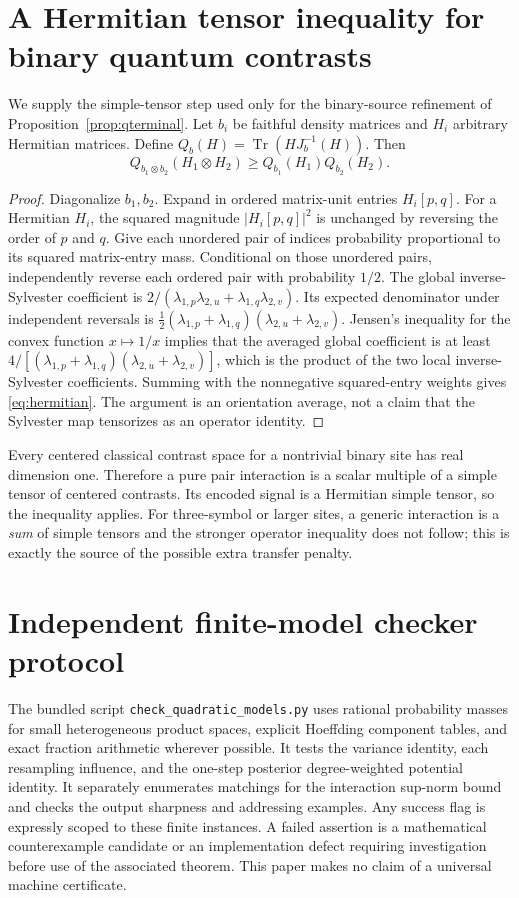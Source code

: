 \documentclass[11pt,letterpaper]{article}
\theoremstyle{definition}
\newcommand{\tr}{\operatorname{Tr}}
\begin{document}
\appendix
\section{A Hermitian tensor inequality for binary quantum contrasts}\label{sec:hermitian}
We supply the simple-tensor step used only for the binary-source
refinement of Proposition~\ref{prop:qterminal}. Let $b_i$ be faithful
density matrices and $H_i$ arbitrary Hermitian matrices. Define
$Q_b(H)=\tr(H J_b^{-1}(H))$. Then
\begin{equation}\label{eq:hermitian}
Q_{b_1\otimes b_2}(H_1\otimes H_2)\ge Q_{b_1}(H_1)Q_{b_2}(H_2).
\end{equation}
\begin{proof}
Diagonalize $b_1,b_2$. Expand in ordered matrix-unit entries
$H_i[p,q]$. For a Hermitian $H_i$, the squared magnitude
$|H_i[p,q]|^2$ is unchanged by reversing the order of $p$ and $q$.
Give each unordered pair of indices probability proportional to its
squared matrix-entry mass. Conditional on those unordered pairs,
independently reverse each ordered pair with probability $1/2$.
The global inverse-Sylvester coefficient is
$2/(\lambda_{1,p}\lambda_{2,u}+\lambda_{1,q}\lambda_{2,v})$.
Its expected denominator under independent reversals is
$\frac12(\lambda_{1,p}+\lambda_{1,q})
(\lambda_{2,u}+\lambda_{2,v})$.
Jensen's inequality for the convex function $x\mapsto1/x$ implies
that the averaged global coefficient is at least
$4/[(\lambda_{1,p}+\lambda_{1,q})(\lambda_{2,u}+\lambda_{2,v})]$,
which is the product of the two local inverse-Sylvester
coefficients. Summing with the nonnegative squared-entry weights
gives \eqref{eq:hermitian}. The argument is an orientation average,
not a claim that the Sylvester map tensorizes as an operator identity.
\end{proof}
Every centered classical contrast space for a nontrivial binary site
has real dimension one. Therefore a pure pair interaction is a
scalar multiple of a simple tensor of centered contrasts. Its
encoded signal is a Hermitian simple tensor, so the inequality
applies. For three-symbol or larger sites, a generic interaction
is a \emph{sum} of simple tensors and the stronger operator
inequality does not follow; this is exactly the source of the
possible extra transfer penalty.

\section{Independent finite-model checker protocol}\label{sec:checker}
The bundled script \texttt{check\_quadratic\_models.py} uses rational
probability masses for small heterogeneous product spaces, explicit
Hoeffding component tables, and exact fraction arithmetic wherever
possible. It tests the variance identity, each resampling influence,
and the one-step posterior degree-weighted potential identity.
It separately enumerates matchings for the interaction sup-norm
bound and checks the output sharpness and addressing examples.
Any success flag is expressly scoped to these finite instances.
A failed assertion is a mathematical counterexample candidate or
an implementation defect requiring investigation before use of
the associated theorem. This paper makes no claim of a universal
machine certificate.
\end{document}
